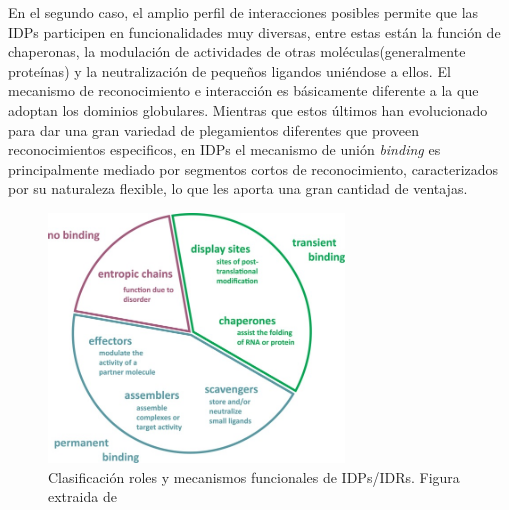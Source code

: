 En el segundo caso, el amplio perfil de interacciones posibles permite que las IDPs participen en funcionalidades muy diversas, entre estas están la función de chaperonas, la modulación de actividades de otras moléculas(generalmente proteínas) 
y la neutralización de pequeños ligandos uniéndose a ellos.
El mecanismo de reconocimiento e interacción es básicamente diferente a la que adoptan los dominios globulares. 
Mientras que estos últimos han evolucionado para dar una gran variedad de plegamientos diferentes que proveen reconocimientos especificos, 
en IDPs el mecanismo de unión \textit{binding} es principalmente mediado por segmentos cortos de reconocimiento\cite{neduva2005systematic,fuxreiter2007local}, caracterizados por su naturaleza flexible, lo que 
les aporta una gran cantidad de ventajas\cite{gunasekaran2003extended,dyson2005intrinsically}.%

% 
% 
% 



\begin{figure}[h!,centered]
\centering
\includegraphics[width=0.7\textwidth]{img/idpFunctionMechanisms.jpg} 
\caption{Clasificación roles y mecanismos funcionales de IDPs/IDRs. Figura extraida de \cite{van2014classification}}
\label{idpFunctions}
\end{figure}


